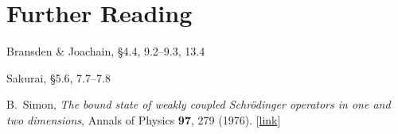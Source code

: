 \documentclass[pra,12pt]{revtex4}
\begin{document}
\section*{Further Reading}

\begin{enumerate}[[1{]}]
\item Bransden \& Joachain, \S4.4, 9.2--9.3, 13.4
\item Sakurai, \S5.6, 7.7--7.8

\item B.~Simon, \textit{The bound state of weakly coupled
  Schr\"odinger operators in one and two dimensions}, Annals of
  Physics \textbf{97}, 279 (1976). [\href{https://doi.org/10.1016/0003-4916(76)90038-5}{link}]
\label{cite:simon}
\end{enumerate}
\end{document}
